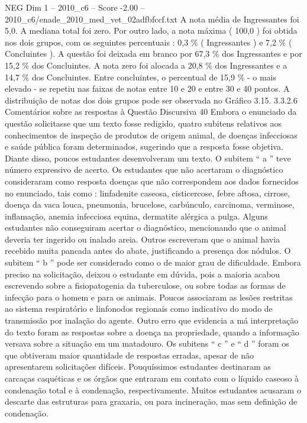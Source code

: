 \begin{textsample}{NEG Dim 1 – 2010\_c6 – Score -2.00 – 2010\_c6/enade\_2010\_med\_vet\_02adfbfccf.txt}
A nota média de Ingressantes foi 5,0.
A mediana total foi zero.
Por outro lado, a nota máxima ( 100,0 ) foi obtida nos dois grupos, com os seguintes percentuais : 0,3 \% ( Ingressantes ) e 7,2 \% ( Concluintes ).
A questão foi deixada em branco por 67,3 \% dos Ingressantes e por 15,2 \% dos Concluintes.
A nota zero foi alocada a 20,8 \% dos Ingressantes e a 14,7 \% dos Concluintes.
Entre concluintes, o percentual de 15,9 \% - o mais elevado - se repetiu nas faixas de notas entre 10 e 20 e entre 30 e 40 pontos.
A distribuição de notas dos dois grupos pode ser observada no Gráfico 3.15. 3.3.2.6 Comentários sobre as respostas à Questão Discursiva 40 Embora o enunciado da questão solicitasse que um texto fosse redigido, quatro subitens relativos aos conhecimentos de inspeção de produtos de origem animal, de doenças infecciosas e saúde pública foram determinados, sugerindo que a resposta fosse objetiva.
Diante disso, poucos estudantes desenvolveram um texto.
O subitem “ a ” teve número expressivo de acerto.
Os estudantes que não acertaram o diagnóstico consideraram como resposta doenças que não correspondem aos dados fornecidos no enunciado, tais como : linfadenite caseosa, cisticercose, febre aftosa, cirrose, doença da vaca louca, pneumonia, brucelose, carbúnculo, carcinoma, verminose, inflamação, anemia infecciosa equina, dermatite alérgica a pulga.
Alguns estudantes não conseguiram acertar o diagnóstico, mencionando que o animal deveria ter ingerido ou inalado areia.
Outros escreveram que o animal havia recebido muita pancada antes do abate, justificando a presença dos nódulos.
O subitem “ b ” pode ser considerado como o de maior grau de dificuldade.
Embora preciso na solicitação, deixou o estudante em dúvida, pois a maioria acabou escrevendo sobre a fisiopatogenia da tuberculose, ou sobre todas as formas de infecção para o homem e para os animais.
Poucos associaram as lesões restritas ao sistema respiratório e linfonodos regionais como indicativo do modo de transmissão por inalação do agente.
Outro erro que evidencia a má interpretação do texto foram as respostas sobre a doença na propriedade, quando a informação versava sobre a situação em um matadouro.
Os subitens “ c ” e “ d ” foram os que obtiveram maior quantidade de respostas erradas, apesar de não apresentarem solicitações difíceis.
Pouquíssimos estudantes destinaram as carcaças caquéticas e os órgãos que entraram em contato com o líquido caseoso à condenação total e à condenação, respectivamente.
Muitos estudantes acusaram o descarte das estruturas para graxaria, ou para incineração, mas sem definição de condenação.

\end{textsample}
